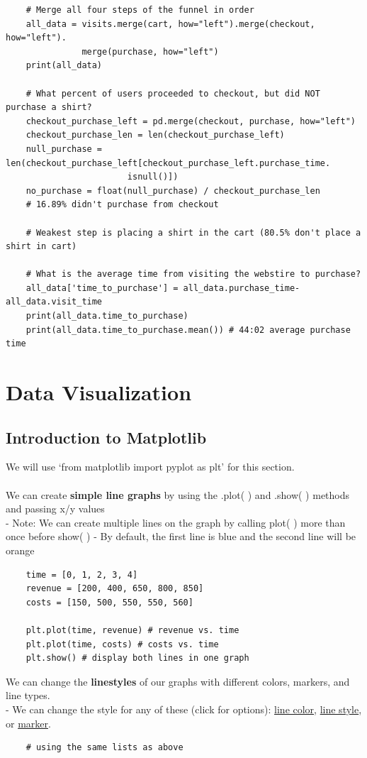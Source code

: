 \documentclass[11pt, a4paper]{article}
\begin{document}
\begin{spacing}{1.1}
\begin{lstlisting}
	# Merge all four steps of the funnel in order
	all_data = visits.merge(cart, how="left").merge(checkout, how="left").
	           merge(purchase, how="left") 
	print(all_data)
	
	# What percent of users proceeded to checkout, but did NOT purchase a shirt?
	checkout_purchase_left = pd.merge(checkout, purchase, how="left")
	checkout_purchase_len = len(checkout_purchase_left) 
	null_purchase = len(checkout_purchase_left[checkout_purchase_left.purchase_time.
	                    isnull()])
	no_purchase = float(null_purchase) / checkout_purchase_len 
	# 16.89% didn't purchase from checkout
	
	# Weakest step is placing a shirt in the cart (80.5% don't place a shirt in cart)
	
	# What is the average time from visiting the webstire to purchase?
	all_data['time_to_purchase'] = all_data.purchase_time-all_data.visit_time
	print(all_data.time_to_purchase)
	print(all_data.time_to_purchase.mean()) # 44:02 average purchase time \end{lstlisting}\newpage
	
	\section{Data Visualization}
	\subsection{Introduction to Matplotlib}
	We will use `from matplotlib import pyplot as plt' for this section. \\~\\
	We can create \textbf{simple line graphs} by using the .plot( ) and .show( ) methods and passing x/y values \\
	\hspace*{3mm} - Note: We can create multiple lines on the graph by calling plot( ) more than once before show( )
	\hspace*{3mm} - By default, the first line is blue and the second line will be orange
	\begin{lstlisting}
	time = [0, 1, 2, 3, 4]
	revenue = [200, 400, 650, 800, 850]
	costs = [150, 500, 550, 550, 560]
	
	plt.plot(time, revenue) # revenue vs. time
	plt.plot(time, costs) # costs vs. time
	plt.show() # display both lines in one graph \end{lstlisting}\vspace*{1mm}
	We can change the \textbf{linestyles} of our graphs with different colors, markers, and line types. \\
	\hspace*{3mm} - We can change the style for any of these (click for options): \href{https://www.w3schools.com/colors/colors_names.asp}{line color}, \href{https://matplotlib.org/3.1.0/gallery/lines_bars_and_markers/linestyles.html}{line style}, or \href{https://matplotlib.org/api/markers_api.html}{marker}.
	\begin{lstlisting}
	# using the same lists as above
	

\end{lstlisting}
\end{spacing}
\end{document}
